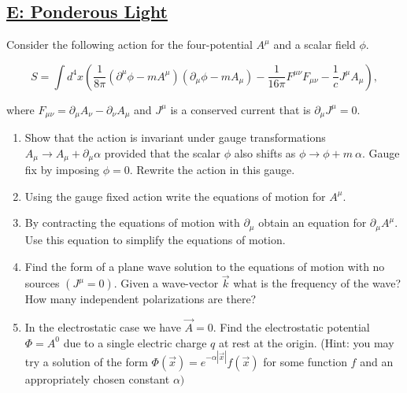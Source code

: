 \subsection{\hyperref[E: Ponderous Light]{E: Ponderous Light}}
Consider the following action for the four-potential $A^{\mu}$ and a scalar field $\phi$.

\begin{equation}
	S=\int d^{4} x\left(\frac{1}{8 \pi}\left(\partial^{\mu} \phi-m A^{\mu}\right)\left(\partial_{\mu} \phi-m A_{\mu}\right)-\frac{1}{16 \pi} F^{\mu \nu} F_{\mu \nu}-\frac{1}{c} J^{\mu} A_{\mu}\right),
\end{equation}

where $F_{\mu \nu}=\partial_{\mu} A_{\nu}-\partial_{\nu} A_{\mu}$ and $J^{\mu}$ is a conserved current that is $\partial_{\mu} J^{\mu}=0$.

\begin{enumerate}
	\item Show that the action is invariant under gauge transformations $A_{\mu} \rightarrow A_{\mu}+\partial_{\mu} \alpha$ provided that the scalar $\phi$ also shifts as $\phi \rightarrow \phi+m\: \alpha .$ Gauge fix by imposing $\phi=0 .$ Rewrite the action in this gauge.
	\item Using the gauge fixed action write the equations of motion for $A^{\mu}$.
	\item By contracting the equations of motion with $\partial_{\mu}$ obtain an equation for $\partial_{\mu} A^{\mu} .$ Use this equation to simplify the equations of motion.
	\item Find the form of a plane wave solution to the equations of motion with no sources $\left(J^{\mu}=0\right)$. Given a wave-vector $\vec{k}$ what is the frequency of the wave? How many independent polarizations are there?
	\item In the electrostatic case we have $\vec{A}=0 .$ Find the electrostatic potential
	$\Phi=A^{0}$ due to a single electric charge $q$ at rest at the origin.
	(Hint: you may try a solution of the form $\Phi(\vec{x})=e^{-\alpha|\vec{x}|} f(\vec{x})$ for some function $f$ and an appropriately chosen constant $\alpha)$
\end{enumerate}


